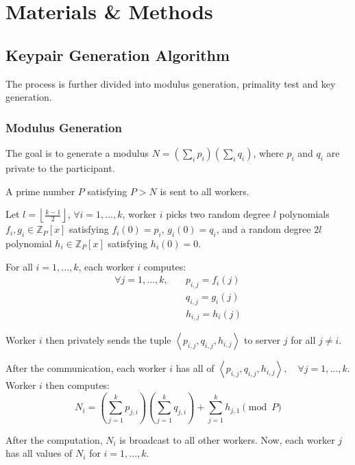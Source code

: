 \chapter{Materials \& Methods}

\section{Keypair Generation Algorithm}

The process is further divided into modulus generation, primality test and key generation.

\subsection{Modulus Generation} \label{section:modulus-generation}

The goal is to generate a modulus $N = \left(\sum_i p_i\right)\left(\sum_i q_i\right)$, where $p_i$ and $q_i$ are private to the participant.

A prime number $P$ satisfying $P > N$ is sent to all workers.

Let $l = \left\lfloor \frac{k-1}{2} \right\rfloor $, $\forall i = 1, ..., k$, worker $i$ picks two random degree $l$ polynomials $f_i, g_i \in \mathbb{Z}_P[x]$ satisfying $f_i(0) = p_i$, $g_i(0) = q_i$, and a random degree $2l$ polynomial $h_i \in \mathbb{Z}_P[x]$ satisfying $h_i(0) = 0$.

For all $i = 1, ..., k$, each worker $i$ computes:
\begin{equation}
\begin{split}
  \forall j = 1, ..., k, \quad & p_{i, j} = f_i(j) \\
  & q_{i, j} = g_i(j) \\
  & h_{i, j} = h_i(j)
\end{split}
\end{equation}

Worker $i$ then privately sends the tuple $\left\langle p_{i,j}, q_{i,j}, h_{i,j}\right\rangle$ to server $j$ for all $j \neq i$.

After the communication, each worker $i$ has all of $\left\langle p_{i,j}, q_{i,j}, h_{i,j}\right\rangle, \quad \forall j = 1, ..., k$. Worker $i$ then computes:
\begin{equation}
    N_i = \left( \sum_{j=1}^{k} p_{j, i}\right)\left( \sum_{j=1}^{k} q_{j, i}\right) + \sum_{j=1}^{k} h_{j,1} \pmod{ P}
\end{equation}

After the computation, $N_i$ is broadcast to all other workers. Now, each worker $j$ has all values of $N_i$ for $i = 1,..., k$.

